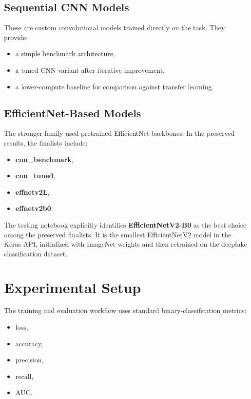 \documentclass[11pt]{article}
\begin{document}
\subsection{Sequential CNN Models}

These are custom convolutional models trained directly on the task. They provide:
\begin{itemize}[leftmargin=1.5em]
    \item a simple benchmark architecture,
    \item a tuned CNN variant after iterative improvement,
    \item a lower-compute baseline for comparison against transfer learning.
\end{itemize}

\subsection{EfficientNet-Based Models}

The stronger family used pretrained EfficientNet backbones. In the preserved results, the finalists include:
\begin{itemize}[leftmargin=1.5em]
    \item \textbf{cnn\_benchmark},
    \item \textbf{cnn\_tuned},
    \item \textbf{effnetv2L},
    \item \textbf{effnetv2b0}.
\end{itemize}

The testing notebook explicitly identifies \textbf{EfficientNetV2-B0} as the best choice among the preserved finalists. It is the smallest EfficientNetV2 model in the Keras API, initialized with ImageNet weights and then retrained on the deepfake classification dataset.

\section{Experimental Setup}

The training and evaluation workflow uses standard binary-classification metrics:
\begin{itemize}[leftmargin=1.5em]
    \item loss,
    \item accuracy,
    \item precision,
    \item recall,
    \item AUC.
\end{itemize}
\end{document}
